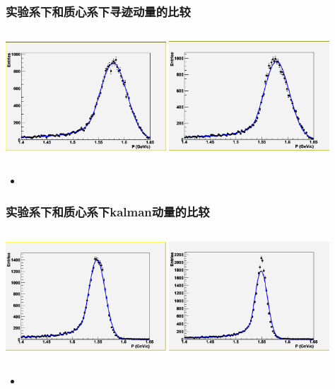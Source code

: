 \documentclass{beamer}
\begin{document}
\begin{frame}
    \frametitle{实验系下和质心系下寻迹动量的比较}
    \begin{columns}
        \column{6.0cm}
        \includegraphics[width=6cm, keepaspectratio]{data/p.png}
        \column{6.0cm}
        \includegraphics[width=6cm, keepaspectratio]{data/pcms.png}
    \end{columns}
    \begin{itemize}
        \item 

    \end{itemize}

\end{frame}


\begin{frame}
    \frametitle{实验系下和质心系下kalman动量的比较}
    \begin{columns}
        \column{6.0cm}
        \includegraphics[width=6cm, keepaspectratio]{data/p_kal.png}
        \column{6.0cm}
        \includegraphics[width=6cm, keepaspectratio]{data/pcms_kal.png}
    \end{columns}
    \begin{itemize}
        \item 
    \end{itemize}

\end{frame}
\end{document}

